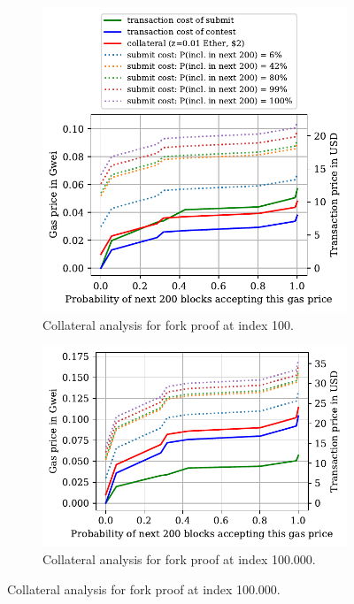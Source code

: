 \begin{figure}[h]
\begin{subfigure}{0.97\linewidth}
    \begin{center}
        \includegraphics[width=1\columnwidth]{figures/cryptoeconomics-100.pdf}
    \end{center}
    \caption{Collateral analysis for fork proof at index 100.}
    \label{fig:cryptoeconomics-100}
\end{subfigure}

\begin{subfigure}{0.97\linewidth}
    \begin{center}
        \includegraphics[width=1\columnwidth]{figures/cryptoeconomics-100K.pdf}
    \end{center}
    \caption{Collateral analysis for fork proof at index 100.000.}
    \label{fig:cryptoeconomics-100K}
\end{subfigure}


\end{figure}

